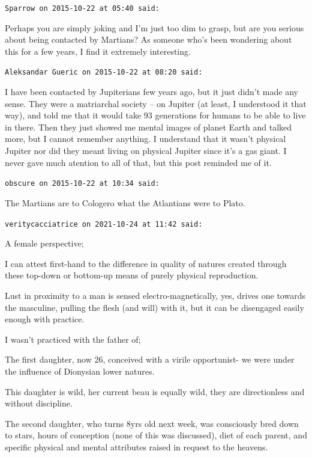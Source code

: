 \begin{footnotesize}
\begin{sffamily}
\texttt{Sparrow on 2015-10-22 at 05:40 said:}

Perhaps you are simply joking and I'm just too dim to grasp, but are you serious about being contacted by Martians? As someone who's been wondering about this for a few years, I find it extremely interesting.

\hfill

\texttt{Aleksandar Gueric on 2015-10-22 at 08:20 said:}

I have been contacted by Jupiterians few years ago, but it just didn't made any sense. They were a matriarchal society -- on Jupiter (at least, I understood it that way), and told me that it would take 93 generations for humans to be able to live in there. Then they just showed me mental images of planet Earth and talked more, but I cannot remember anything. I understand that it wasn't physical Jupiter nor did they meant living on physical Jupiter since it's a gas giant. I never gave much atention to all of that, but this post reminded me of it.

\hfill

\texttt{obscure on 2015-10-22 at 10:34 said:}

The Martians are to Cologero what the Atlantians were to Plato.

\hfill

\texttt{veritycacciatrice on 2021-10-24 at 11:42 said:}

A female perspective;

I can attest first-hand to the difference in quality of natures created through these top-down or bottom-up means of purely physical reproduction.

Lust in proximity to a man is sensed electro-magnetically, yes, drives one towards the masculine, pulling the flesh (and will) with it, but it can be disengaged easily enough with practice.

I wasn't practiced with the father of;

The first daughter, now 26, conceived with a virile opportunist- we were under the influence of Dionysian lower natures.

This daughter is wild, her current beau is equally wild, they are directionless and without discipline.

The second daughter, who turns 8yrs old next week, was consciously bred down to stars, hours of conception (none of this was discussed), diet of each parent, and specific physical and mental attributes raised in request to the heavens.


\end{sffamily}
\end{footnotesize}

